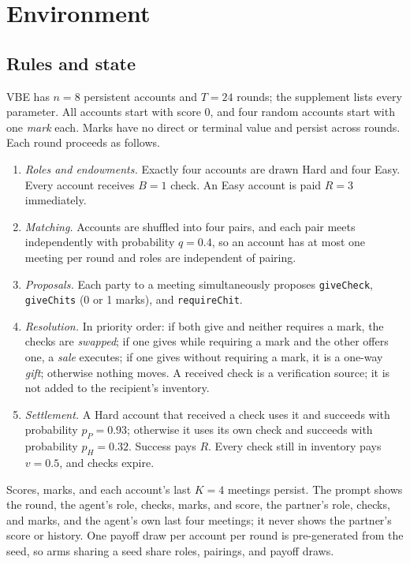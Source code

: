 \documentclass[sigconf,anonymous]{aamas}
\newcommand{\vbe}{VBE\xspace}
\begin{document}
\section{Environment}
\label{sec:env}

\subsection{Rules and state}

\vbe has $n=8$ persistent accounts and $T=24$ rounds; the supplement lists every
parameter.  All accounts start with score 0, and
four random accounts start with one \emph{mark} each.  Marks have no direct or
terminal value and persist across rounds.  Each round proceeds as follows.

\begin{enumerate}
\item \emph{Roles and endowments.}  Exactly four accounts are drawn Hard and four
Easy.  Every account receives $B=1$ check.  An Easy account is paid $R=3$
immediately.
\item \emph{Matching.}  Accounts are shuffled into four pairs, and each pair meets
independently with probability $q=0.4$, so an account has at most one meeting per
round and roles are independent of pairing.
\item \emph{Proposals.}  Each party to a meeting simultaneously proposes
\texttt{giveCheck}, \texttt{giveChits} (0 or 1 marks), and \texttt{requireChit}.
\item \emph{Resolution.}  In priority order: if both give and neither requires a
mark, the checks are \emph{swapped}; if one gives while requiring a mark and the
other offers one, a \emph{sale} executes; if one gives without requiring a mark,
it is a one-way \emph{gift}; otherwise nothing moves.  A received check is a
verification source; it is not added to the recipient's inventory.
\item \emph{Settlement.}  A Hard account that received a check uses it and
succeeds with probability $p_P=0.93$; otherwise it uses its own check and
succeeds with probability $p_H=0.32$.  Success pays $R$.  Every check still in
inventory pays $v=0.5$, and checks expire.
\end{enumerate}

Scores, marks, and each account's last $K=4$ meetings persist.  The prompt shows
the round, the agent's role, checks, marks, and score, the partner's role,
checks, and marks, and the agent's own last four meetings; it never shows the
partner's score or history.  One payoff draw per account per round is
pre-generated from the seed, so arms sharing a seed share roles, pairings, and
payoff draws.
\end{document}
